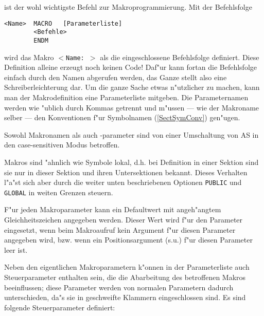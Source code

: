 \documentclass[12pt,a4paper,twoside]{report}
\newcommand{\tty}[1]{{\tt #1}}
\begin{document}
ist der wohl wichtigste Befehl zur Makroprogrammierung.  Mit der
Befehlsfolge
\begin{verbatim}
<Name>  MACRO   [Parameterliste]
        <Befehle>
        ENDM
\end{verbatim}
wird das Makro \tty{$<$Name:  $>$} als die eingeschlossene Befehlsfolge
definiert. Diese Definition alleine erzeugt noch keinen Code!  Daf"ur kann
fortan die Befehlsfolge einfach durch den Namen abgerufen werden, das Ganze
stellt also eine Schreiberleichterung dar.  Um die ganze Sache etwas
n"utzlicher zu machen, kann man der Makrodefinition eine Parameterliste
mitgeben.  Die Parameternamen werden wie "ublich durch Kommas getrennt
und m"ussen --- wie der Makroname selber --- den Konventionen f"ur
Symbolnamen (\ref{SectSymConv}) gen"ugen.
\par
Sowohl Makronamen als auch -parameter sind von einer Umschaltung
von AS in den case-sensitiven Modus betroffen.
\par
Makros sind "ahnlich wie Symbole lokal, d.h. bei Definition in
einer Sektion sind sie nur in dieser Sektion und ihren Untersektionen
bekannt.  Dieses Verhalten l"a"st sich aber durch die weiter unten
beschriebenen Optionen \tty{PUBLIC} und \tty{GLOBAL} in weiten Grenzen
steuern.
\par
F"ur jeden Makroparameter kann ein Defaultwert mit angeh"angtem
Gleichheitszeichen angegeben werden.  Dieser Wert wird f"ur den
Parameter eingesetzt, wenn beim Makroaufruf kein Argument f"ur
diesen Parameter angegeben wird, bzw. wenn ein Positionsargument
(s.u.) f"ur diesen Parameter leer ist.
\par
Neben den eigentlichen Makroparametern k"onnen in der Parameterliste
auch Steuerparameter enthalten sein, die die Abarbeitung des betroffenen
Makros beeinflussen; diese Parameter werden von normalen Parametern
dadurch unterschieden, da"s sie in geschweifte Klammern eingeschlossen
sind.  Es sind folgende Steuerparameter definiert:
\end{document}
